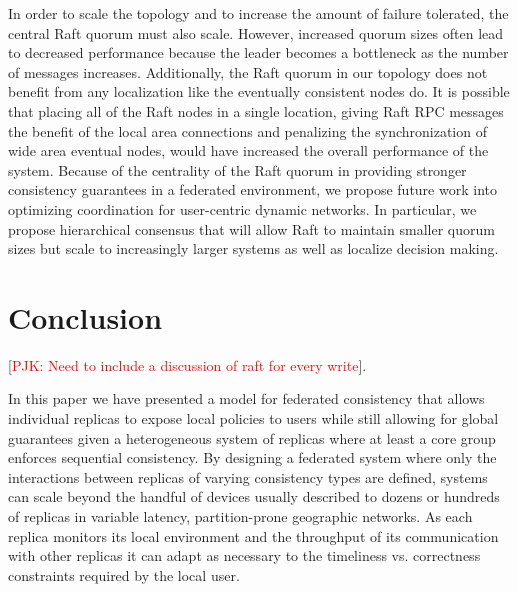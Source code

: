 \documentclass[10pt,conference,letterpaper]{IEEEtran}
\newcommand{\todo}[1]{{\textcolor{red}{#1}}}
\newcommand{\pjk}[1]{[\todo{PJK: #1}]}
\begin{document}
In order to scale the topology and to increase the amount of failure tolerated, the central Raft quorum must also scale. However, increased quorum sizes often lead to decreased performance because the leader becomes a bottleneck as the number of messages increases. Additionally, the Raft quorum in our topology does not benefit from any localization like the eventually consistent nodes do. It is possible that placing all of the Raft nodes in a single location, giving Raft RPC messages the benefit of the local area connections and penalizing the synchronization of wide area eventual nodes, would have increased the overall performance of the system. Because of the centrality of the Raft quorum in providing stronger consistency guarantees in a federated environment, we propose future work into optimizing coordination for user-centric dynamic networks. In particular, we propose hierarchical consensus that will allow Raft to maintain smaller quorum sizes but scale to increasingly larger systems as well as localize decision making.

\section{Conclusion}

\pjk{Need to include a discussion of raft for every write}.

In this paper we have presented a model for federated consistency that allows individual replicas to expose local policies to users while still allowing for global guarantees given a heterogeneous system of replicas where at least a core group enforces sequential consistency. By designing a federated system where only the interactions between replicas of varying consistency types are defined, systems can scale beyond the handful of devices usually described to dozens or hundreds of replicas in variable latency, partition-prone geographic networks. As each replica monitors its local environment and the throughput of its communication with other replicas it can adapt as necessary to the timeliness vs. correctness constraints required by the local user.

%



\end{document}
